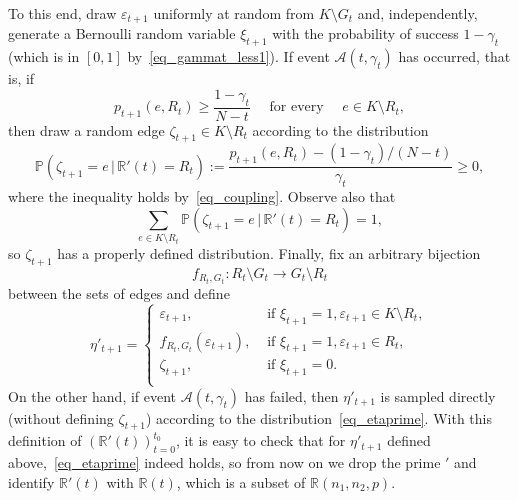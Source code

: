 \documentclass[12pt,reqno]{amsart}
\newcommand{\ac}{{\mathcal{A}}}
\newcommand{\Prob} {\mathbb {P}}
\newcommand{\prob}[1]{\Prob\left(#1\right)}
\newcommand{\Pc}[2]{\prob{#1\,|\,#2}}
\newcommand{\eps} {\varepsilon}
\newcommand{\R} {\mathbb R}
\newcommand{\Rnnp}{\R(n_1,n_2,p)}
\theoremstyle{definition}
\begin{document}
To this end, draw $\eps_{t + 1}$ uniformly at random from $K \setminus G_t$ and, independently, generate a
Bernoulli random variable $\xi_{t+1}$ with the probability of success  $1 - \gamma_t$ (which is in $[0,1]$ by~\eqref{eq_gammat_less1}). If event
$\ac(t, \gamma_t)$ has occurred, that is, if
\begin{equation}
  \label{eq_coupling}
p_{t+1}(e, R_t) \ge \frac{1 - \gamma_t}{N - t} \quad \text{ for every } \quad e \in K
\setminus R_t,
\end{equation}
then  draw a random edge $\zeta_{t+1} \in K \setminus R_t$ according to the distribution
\begin{equation*}
\Pc{\zeta_{t+1} = e}{\R'(t) = R_t} := \frac{p_{t+1}(e, R_t) - (1 - \gamma_t)/(N - t) }{\gamma_t} \ge 0,
\end{equation*}
where the inequality holds by~\eqref{eq_coupling}. Observe also that
\begin{equation*}
\sum_{e\in K \setminus R_t}\Pc{\zeta_{t+1} = e}{\R'(t) = R_t} = 1,
\end{equation*}
so $\zeta_{t+1}$ has a properly defined distribution. Finally, fix an arbitrary bijection
\[
  f_{R_t, G_t} : R_t \setminus G_t \to G_t \setminus R_t
\]
 between the sets of edges and define
\begin{equation*}
\eta'_{t+1} = \begin{cases}
\eps_{t+1}, &\text{ if } \xi_{t + 1} = 1, \eps_{t+1} \in K \setminus R_t,\\
f_{R_t, G_t}(\eps_{t+1}), &\text{ if } \xi_{t + 1} = 1, \eps_{t+1} \in R_t,\\
\zeta_{t+1}, &\text{ if } \xi_{t + 1} = 0. \\
\end{cases}
\end{equation*}
On the other hand, if event $\ac(t, \gamma_t)$ has failed, then $\eta'_{t+1}$ is sampled
directly (without defining $\zeta_{t+1}$) according to the distribution~\eqref{eq_etaprime}.
With this definition of $(\R'(t))_{t= 0}^{t_0}$, it is easy to check that for $\eta'_{t+1}$ defined above,~\eqref{eq_etaprime} indeed holds, so from now on we drop the prime $'$ and identify $\R'(t)$ with $\R(t)$, which is a subset of $\Rnnp$.
\end{document}
